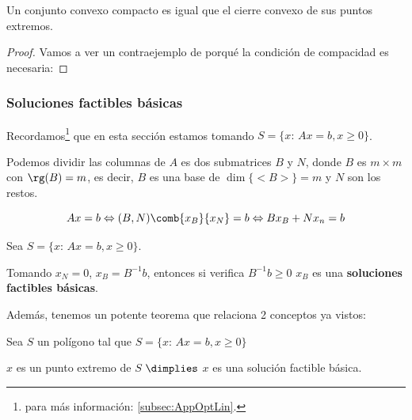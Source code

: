 \begin{prop}
Un conjunto convexo compacto es igual que el cierre convexo de sus puntos extremos.
\end{prop}

\begin{proof}
Vamos a ver un contraejemplo de porqué la condición de compacidad es necesaria:


%
%
\end{proof}

\begin{figure}[h]
\centering
{}
\end{figure}



\subsubsection{Soluciones factibles básicas}
Recordamos\footnote{ para más información: \ref{subsec:AppOptLin}.} que en esta sección estamos tomando $S=\{x:\, Ax=b, x\geq 0\}$.

Podemos dividir las columnas de $A$ es dos submatrices $B$ y $N$, donde $B$ es $m\times m$ con $\rg(B)=m$, es decir, $B$ es una base de $\dim\{<B>\} = m$ y $N$ son los restos.


\[
Ax=b \Leftrightarrow (B,N) {\comb{x_B}{x_N}}=b \Leftrightarrow B x_B + Nx_n = b
\]

\label{def:SFB}
\begin{defn}
Sea $S=\{x:\, Ax=b, x\geq 0\}$.

Tomando $x_N=0$, $x_B=B^{-1}b$, entonces si verifica $B^{-1}b\geq 0$ $x_B$ es una \textbf{soluciones factibles básicas}.
\end{defn}


Además, tenemos un potente teorema que relaciona 2 conceptos ya vistos:


\begin{theorem}
Sea $S$ un polígono tal que $S=\{x:\, Ax=b, x\geq 0\}$

$x$ es un punto extremo de $S$ $\dimplies$ $x$ es una solución factible básica.
\end{theorem}

